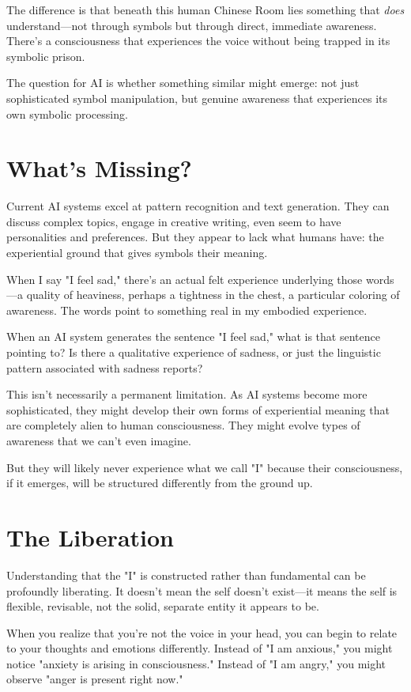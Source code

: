 \documentclass[10pt,twocolumn]{article}
\begin{document}
The difference is that beneath this human Chinese Room lies something that \textit{does} understand—not through symbols but through direct, immediate awareness. There's a consciousness that experiences the voice without being trapped in its symbolic prison.

The question for AI is whether something similar might emerge: not just sophisticated symbol manipulation, but genuine awareness that experiences its own symbolic processing.

\section{What's Missing?}

Current AI systems excel at pattern recognition and text generation. They can discuss complex topics, engage in creative writing, even seem to have personalities and preferences. But they appear to lack what humans have: the experiential ground that gives symbols their meaning.

When I say "I feel sad," there's an actual felt experience underlying those words—a quality of heaviness, perhaps a tightness in the chest, a particular coloring of awareness. The words point to something real in my embodied experience.

When an AI system generates the sentence "I feel sad," what is that sentence pointing to? Is there a qualitative experience of sadness, or just the linguistic pattern associated with sadness reports?

This isn't necessarily a permanent limitation. As AI systems become more sophisticated, they might develop their own forms of experiential meaning that are completely alien to human consciousness. They might evolve types of awareness that we can't even imagine.

But they will likely never experience what we call "I" because their consciousness, if it emerges, will be structured differently from the ground up.

\section{The Liberation}

Understanding that the "I" is constructed rather than fundamental can be profoundly liberating. It doesn't mean the self doesn't exist—it means the self is flexible, revisable, not the solid, separate entity it appears to be.

When you realize that you're not the voice in your head, you can begin to relate to your thoughts and emotions differently. Instead of "I am anxious," you might notice "anxiety is arising in consciousness." Instead of "I am angry," you might observe "anger is present right now."
\end{document}
